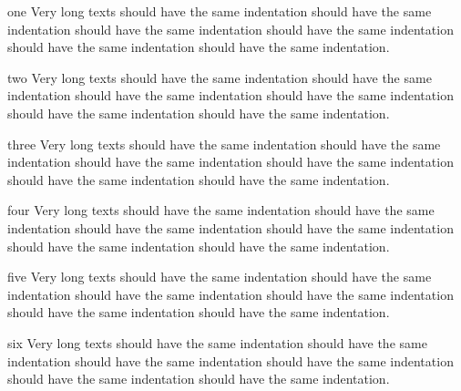 \documentclass{article}
\begin{document}
\begin{enumerate}
\item one Very long texts should have the same indentation should have the same indentation 
should have the same indentation should have the same indentation should have the same indentation 
should have the same indentation.
\item two Very long texts should have the same indentation should have the same indentation 
should have the same indentation should have the same indentation should have the same indentation 
should have the same indentation.
{\setlength\leftmarginii{50pt}\setlength\itemindent{25pt}
\item three 
Very long texts should have the same indentation should have the same indentation 
should have the same indentation should have the same indentation should have the same indentation 
should have the same indentation.}
\item four Very long texts should have the same indentation should have the same indentation 
should have the same indentation should have the same indentation should have the same indentation 
should have the same indentation.
\setlength\itemindent{100pt} 
\item five Very long texts should have the same indentation should have the same indentation 
should have the same indentation should have the same indentation should have the same indentation 
should have the same indentation.
\item six Very long texts should have the same indentation should have the same indentation 
should have the same indentation should have the same indentation should have the same indentation 
should have the same indentation.
\end{enumerate}
\end{document}
